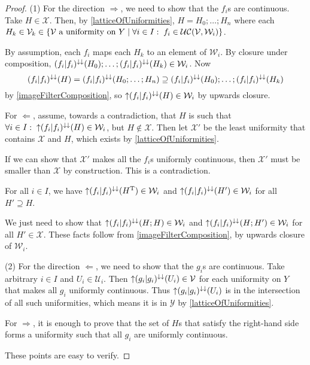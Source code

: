 \begin{proof}
(1) For the direction $\Rightarrow$, we need to show that the $f_i$s are continuous. Take $H\in \mathcal{X}$. Then, by \ref{latticeOfUniformities}, $H = H_0;\ldots;H_n$ where each $H_k\in \mathcal{V}_k \in \left\{ \text{$\mathcal{V}$ a uniformity on $Y$} \;\middle|\; \forall i\in I:\; f_i\in \operatorname{\mathcal{UC}}(\mathcal{V}, \mathcal{W}_i) \right\}$.

By assumption, each $f_i$ maps each $H_k$ to an element of $\mathcal{W}_i$. By closure under composition, $(f_{i}|f_{i})^{\downarrow\downarrow}(H_0);\ldots;(f_{i}|f_{i})^{\downarrow\downarrow}(H_k)\in\mathcal{W}_i$. Now
\[ (f_i|f_i)^{\downarrow\downarrow}(H) = (f_i|f_i)^{\downarrow\downarrow}(H_0;\ldots; H_n) \supseteq (f_{i}|f_{i})^{\downarrow\downarrow}(H_0);\ldots;(f_{i}|f_{i})^{\downarrow\downarrow}(H_k) \]
by \ref{imageFilterComposition}, so $\operatorname{\uparrow} (f_i|f_i)^{\downarrow\downarrow}(H) \in \mathcal{W}_i$ by upwards closure.

For $\Leftarrow$, assume, towards a contradiction, that $H$ is such that $\forall i\in I: \; \operatorname{\uparrow}(f_i|f_i)^{\downarrow\downarrow}(H) \in \mathcal{W}_i$, but $H \notin \mathcal{X}$. Then let $\mathcal{X}'$ be the least uniformity that contains $\mathcal{X}$ and $H$, which exists by \ref{latticeOfUniformities}.

If we can show that $\mathcal{X}'$ makes all the $f_i$s uniformly continuous, then $\mathcal{X}'$ must be smaller than $\mathcal{X}$ by construction. This is a contradiction.

For all $i\in I$, we have $\operatorname{\uparrow}(f_i|f_i)^{\downarrow\downarrow}(H^{\mathrm{T}}) \in \mathcal{W}_i$ and $\operatorname{\uparrow}(f_i|f_i)^{\downarrow\downarrow}(H') \in \mathcal{W}_i$ for all $H'\supseteq H$.

We just need to show that $\operatorname{\uparrow}(f_i|f_i)^{\downarrow\downarrow}(H;H) \in \mathcal{W}_i$ and $\operatorname{\uparrow}(f_i|f_i)^{\downarrow\downarrow}(H;H') \in \mathcal{W}_i$ for all $H'\in \mathcal{X}$. These facts follow from \ref{imageFilterComposition}, by upwards closure of $\mathcal{W}_i$.

(2) For the direction $\Leftarrow$, we need to show that the $g_i$s are continuous. Take arbitrary $i\in I$ and $U_i\in \mathcal{U}_i$. Then $\operatorname{\uparrow} (g_i|g_i)^{\downarrow\downarrow}(U_i)\in \mathcal{V}$ for each uniformity on $Y$ that makes all $g_i$ uniformly continuous. Thus $\operatorname{\uparrow} (g_i|g_i)^{\downarrow\downarrow}(U_i)$ is in the intersection of all such uniformities, which means it is in $\mathcal{Y}$ by \ref{latticeOfUniformities}.

For $\Rightarrow$, it is enough to prove that the set of $H$s that satisfy the right-hand side forms a uniformity such that all $g_i$ are uniformly continuous.

These points are easy to verify.
\end{proof}


